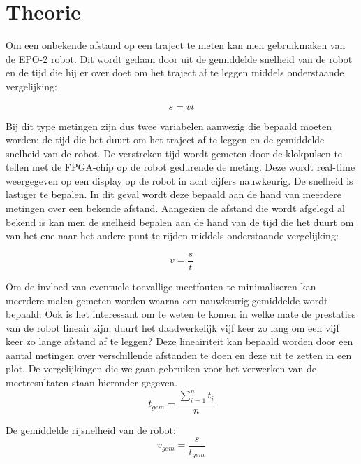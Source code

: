 \documentclass{report}
\begin{document}
\chapter{Theorie}
Om een onbekende afstand op een traject te meten kan men gebruikmaken van de EPO-2 robot. Dit wordt gedaan door uit de gemiddelde snelheid van de robot en de tijd 
die hij er over doet om het traject af te leggen middels onderstaande vergelijking:

\begin{equation}
	\label{eq:vel}
	s = vt
\end{equation}

\noindent
Bij dit type metingen zijn dus twee variabelen aanwezig die bepaald moeten worden: de tijd die het duurt om het traject af te leggen en de gemiddelde snelheid van de robot. 
De verstreken tijd wordt gemeten door de klokpulsen te tellen met de FPGA-chip op de robot gedurende de meting. Deze wordt real-time weergegeven op een display op de robot in acht cijfers nauwkeurig.
De snelheid is lastiger te bepalen. In dit geval wordt deze bepaald aan de hand van meerdere metingen over een bekende afstand. Aangezien de afstand die wordt afgelegd al bekend is kan men de snelheid bepalen aan de hand van de tijd die het duurt om van het ene naar het andere punt te rijden middels onderstaande vergelijking:

\begin{equation}
	\label{eq:vel}
	v=\frac{s}{t}
\end{equation}

\noindent
Om de invloed van eventuele toevallige meetfouten te minimaliseren kan meerdere malen gemeten worden waarna een nauwkeurig gemiddelde wordt bepaald. Ook is het interessant om te weten te komen in welke mate de prestaties van de robot lineair zijn; duurt het daadwerkelijk vijf keer zo lang om een vijf keer zo lange afstand af te leggen? Deze lineairiteit kan bepaald worden door een aantal metingen over verschillende afstanden te doen en deze uit te zetten in een plot. De vergelijkingen die we gaan gebruiken voor het verwerken van de meetresultaten staan hieronder gegeven.\\

\begin{equation}
\label{eq:avgTime}
	t_{gem}=\frac{\sum_{i=1}^{n}t_i}{n}
\end{equation}

\noindent
De gemiddelde rijsnelheid van de robot:
\begin{equation}
\label{eq:avgVel}
	v_{gem} = \frac{s}{t_{gem}}
\end{equation}
\end{document}
